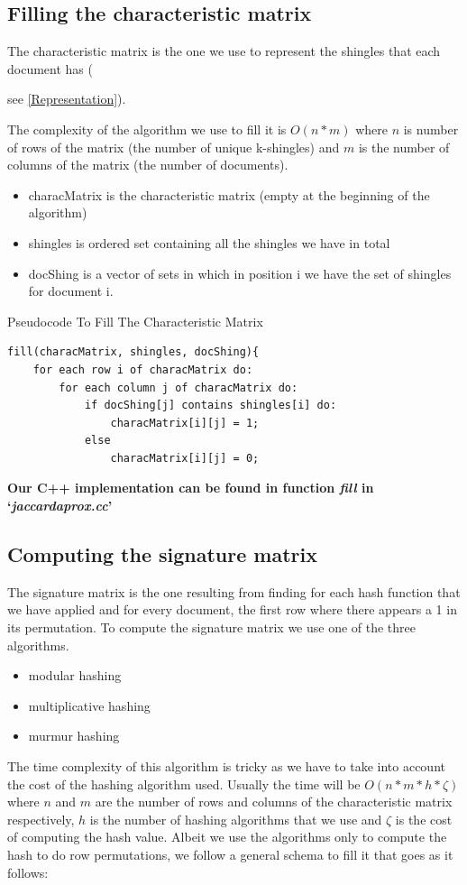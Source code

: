 \documentclass[12pt]{article}
\begin{document}
\subsection{Filling the characteristic matrix} \label{fillingCharacMatrix}
The characteristic matrix is the one we use to represent the shingles that each document has ({see \autoref{Representation}). 

\bigskip
The complexity of the algorithm we use to fill it is $O(n*m)$ where $n$ is number of rows of the matrix (the number of unique k-shingles) and $m$ is the number of columns of the matrix (the number of documents).

\begin{itemize}
\item characMatrix is the characteristic matrix (empty at the beginning of the algorithm)
\item shingles is ordered set containing all the shingles we have in total
\item docShing is a vector of sets in which in position i we have the set of shingles for document i. 
\end{itemize}
 \begin{center}
\begin{large}
Pseudocode To Fill The Characteristic Matrix
\end{large}
\end{center}
 \begin{lstlisting}
fill(characMatrix, shingles, docShing){
    for each row i of characMatrix do:
        for each column j of characMatrix do:
            if docShing[j] contains shingles[i] do:
            	characMatrix[i][j] = 1;
            else
            	characMatrix[i][j] = 0;
\end{lstlisting}

\bigskip
\textbf{Our C++ implementation can be found in function \textit{fill} in `\textit{\mbox{jaccardaprox.cc}}'}

\subsection{Computing the signature matrix} \label{computingSignMatrix}
The signature matrix is the one resulting from finding for each hash function that we have applied and for every document, the first row where there appears a 1 in its permutation.
To compute the signature matrix we use one of the three algorithms.
\begin{itemize}
\item modular hashing
\item multiplicative hashing
\item murmur hashing 
\end{itemize}
The time complexity of this algorithm is tricky as we have to take into account the cost of the hashing algorithm used. Usually the time will be $O(n*m*h*\zeta)$ where $n$ and $m$ are the number of rows and columns of the characteristic matrix respectively, $h$ is the number of hashing algorithms that we use and $\zeta$ is the cost of computing the hash value.
Albeit we use the algorithms only to compute the hash to do row permutations, we follow a general schema to fill it that goes as it follows:

}
\end{document}

